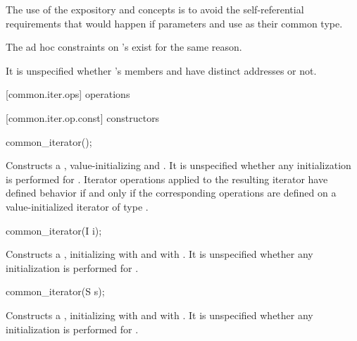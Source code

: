 \begin{addedblock}
\pnum
\enternote The use of the expository  and
 concepts is to avoid the self-referential requirements that
would happen if parameters  and  use 
as their common type.\exitnote

\pnum
\enternote The ad hoc constraints on 's 
exist for the same reason.\exitnote

\pnum
\enternote It is unspecified whether 's members
 and  have distinct addresses or not.\exitnote

[common.iter.ops]{ operations}

[common.iter.op.const]{ constructors}

%
\begin{itemdecl}
common_iterator();
\end{itemdecl}

\begin{itemdescr}
\pnum
\effects Constructs a , value-initializing 
and . It is unspecified whether any initialization is performed for
. Iterator operations applied to the resulting iterator have defined
behavior if and only if the corresponding operations are defined on a
value-initialized iterator of type .
\end{itemdescr}

%
\begin{itemdecl}
common_iterator(I i);
\end{itemdecl}

\begin{itemdescr}
\pnum
\effects Constructs a , initializing
 with  and  with . It is
unspecified whether any initialization is performed for .
\end{itemdescr}

%
\begin{itemdecl}
common_iterator(S s);
\end{itemdecl}

\begin{itemdescr}
\pnum
\effects Constructs a , initializing
 with  and  with . It is
unspecified whether any initialization is performed for .
\end{itemdescr}


\end{addedblock}
